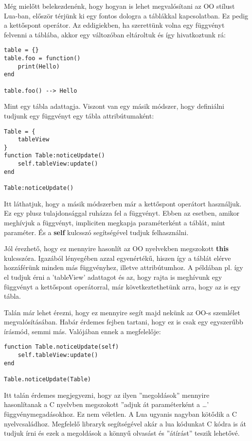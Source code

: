 Még mielőtt belekezdenénk, hogy hogyan is lehet megvalósítani az OO stílust Lua-ban, először térjünk ki egy fontos dologra a táblákkal kapcsolatban. Ez pedig a kettőspont operátor. Az eddigiekben, ha szerettünk volna egy függvényt felvenni a táblába, akkor egy változóban eltároltuk és így hivatkoztunk rá:
\scriptsize
\begin{lstlisting}
table = {}
table.foo = function()
	print(Hello)
end

table.foo() --> Hello
\end{lstlisting}
\normalsize
Mint egy tábla adattagja. Viszont van egy másik módszer, hogy definiálni tudjunk egy függvényt egy tábla attribútumaként:
\scriptsize
\begin{lstlisting}
Table = {
	tableView
}
function Table:noticeUpdate()
	self.tableView:update()
end

Table:noticeUpdate()
\end{lstlisting}
\normalsize
Itt láthatjuk, hogy a másik módszerben már a kettőspont operátort használjuk. Ez egy plusz tulajdonsággal ruházza fel a függvényt. Ebben az esetben, amikor meghívjuk a függvényt, impliciten megkapja paraméterként a táblát, mint paraméter. És a \textbf{self} kulcsszó segítségével tudjuk felhasználni.

Jól érezhető, hogy ez mennyire hasonlít az OO nyelvekben megszokott \textbf{this} kulcsszóra. Igazából lényegében azzal egyenértékű, hiszen így a táblát elérve hozzáférünk minden más függvényhez, illetve attribútumhoz. A példában pl. így el tudjuk érni a 'tableView' adattagot és az, hogy rajta is meghívunk egy függvényt a kettőspont operátorral, már következtethetünk arra, hogy az is egy tábla.

Talán már lehet érezni, hogy ez mennyire segít majd nekünk az OO-s szemlélet megvalósításában. Habár érdemes fejben tartani, hogy ez is csak egy egyszerűbb írásmód, semmi más. Valójában ennek a megfelelője:
\scriptsize
\begin{lstlisting}
function Table.noticeUpdate(self)
	self.tableView:update()
end

Table.noticeUpdate(Table)
\end{lstlisting}
\normalsize
Itt talán érdemes megjegyezni, hogy az ilyen ''megoldások'' mennyire hasonlítanak a C nyelvben megszokott ''adjuk át paraméterként a \dots' függvénymegadásokhoz. Ez nem véletlen. A Lua ugyanis nagyban kötődik a C nyelvcsaládhoz. Megfelelő libraryk segítségével akár a lua kódunkat C kódra is át tudjuk írni és ezek a megoldások a könnyű olvasást és ''átírást'' teszik lehetővé.

